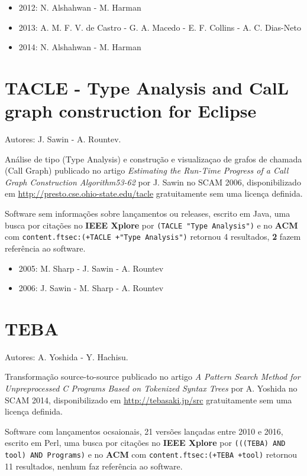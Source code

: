 \begin{itemize}
\item 2012: N. Alshahwan - M. Harman
\item 2013: A. M. F. V. de Castro - G. A. Macedo - E. F. Collins - A. C. Dias-Neto
\item 2014: N. Alshahwan - M. Harman
\end{itemize}

\section{TACLE - Type Analysis and CalL graph construction for Eclipse}

Autores:
J. Sawin - A. Rountev.

Análise de tipo (Type Analysis) e construção e visualizaçao de grafos de chamada (Call Graph)
publicado no artigo {\it Estimating the Run-Time Progress of a Call Graph Construction Algorithm53-62}
por J. Sawin
no SCAM 2006,
disponibilizado em \url{http://presto.cse.ohio-state.edu/tacle}
gratuitamente
sem uma licença definida.

Software sem informações sobre lançamentos ou releases,
escrito em Java,
uma busca por citações no {\bf IEEE Xplore} por
\texttt{(TACLE "Type Analysis")}
e no {\bf ACM} com
\texttt{content.ftsec:(+TACLE +"Type Analysis")}
retornou
4 resultados,
{\bf 2} fazem referência ao software.

\begin{itemize}
\item 2005: M. Sharp - J. Sawin - A. Rountev
\item 2006: J. Sawin - M. Sharp - A. Rountev
\end{itemize}

\section{TEBA}

Autores:
A. Yoshida - Y. Hachisu.

Transformação source-to-source
publicado no artigo {\it A Pattern Search Method for Unpreprocessed C Programs Based on Tokenized Syntax Trees}
por A. Yoshida
no SCAM 2014,
disponibilizado em \url{http://tebasaki.jp/src}
gratuitamente
sem uma licença definida.

Software com lançamentos ocsaionais,
21 versões lançadas
entre 2010 e 2016,
escrito em Perl,
uma busca por citações no {\bf IEEE Xplore} por
\texttt{(((TEBA) AND tool) AND Programs)}
e no {\bf ACM} com
\texttt{content.ftsec:(+TEBA +tool)}
retornou
11 resultados,
nenhum faz referência ao software.


